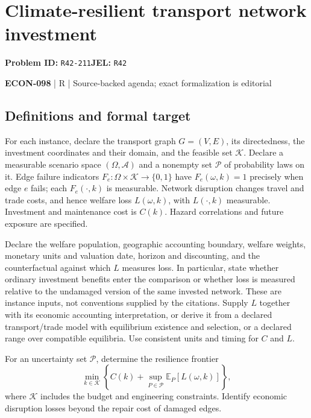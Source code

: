 \documentclass[11pt,a4paper]{article}
\begin{document}
\section*{Climate-resilient transport network investment}
\textbf{Problem ID:} \texttt{R42-211}\quad \textbf{JEL:} \texttt{R42}\par
\label{problem:OP-0653}


\label{audited:ECON-098}

{\sffamily\small\color{muted}\textbf{ECON-098} | R | Source-backed agenda; exact formalization is editorial\par}

\subsection*{Definitions and formal target}

For each instance, declare the transport graph $G=(V,E)$, its directedness, the investment coordinates and their domain, and the feasible set $\mathcal K$. Declare a measurable scenario space $(\Omega,\mathcal A)$ and a nonempty set $\mathcal P$ of probability laws on it. Edge failure indicators $F_e:\Omega\times\mathcal K\to\{0,1\}$ have $F_e(\omega,k)=1$ precisely when edge $e$ fails; each $F_e(\cdot,k)$ is measurable. Network disruption changes travel and trade costs, and hence welfare loss $L(\omega,k)$, with $L(\cdot,k)$ measurable. Investment and maintenance cost is $C(k)$. Hazard correlations and future exposure are specified.

Declare the welfare population, geographic accounting boundary, welfare weights, monetary units and valuation date, horizon and discounting, and the counterfactual against which $L$ measures loss. In particular, state whether ordinary investment benefits enter the comparison or whether loss is measured relative to the undamaged version of the same invested network. These are instance inputs, not conventions supplied by the citations. Supply $L$ together with its economic accounting interpretation, or derive it from a declared transport/trade model with equilibrium existence and selection, or a declared range over compatible equilibria. Use consistent units and timing for $C$ and $L$.

For an uncertainty set $\mathcal P$, determine the resilience frontier
\[
 \min_{k\in\mathcal K}\left\{C(k)+\sup_{P\in\mathcal P}\mathbb E_P[L(\omega,k)]\right\},
\]
where $\mathcal K$ includes the budget and engineering constraints. Identify economic disruption losses beyond the repair cost of damaged edges.
\end{document}
